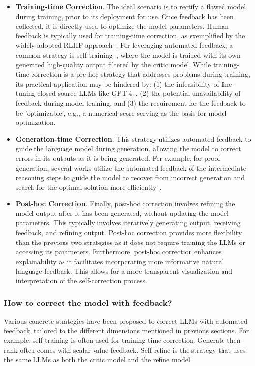 \documentclass[12pt]{extarticle}
\begin{document}
\begin{itemize}
    \item \textbf{Training-time Correction}. The ideal scenario is to rectify a flawed model during training, prior to its deployment for use. Once feedback has been collected, it is directly used to optimize the model parameters. Human feedback is typically used for training-time correction, as exemplified by the widely adopted RLHF approach~\cite{ouyang2022training}. For leveraging automated feedback, a common strategy is self-training~\cite{huang2022large}, where the model is trained with its own generated high-quality output filtered by the critic model. While training-time correction is a pre-hoc strategy that addresses problems during training, its practical application may be hindered by: (1) the infeasibility of fine-tuning closed-source LLMs like GPT-4~\cite{openai2023gpt4}, (2) the potential unavailability of feedback during model training, and (3) the requirement for the feedback to be 'optimizable', e.g., a numerical score serving as the basis for model optimization.

    \item \textbf{Generation-time Correction}. This strategy utilizes automated feedback to guide the language model during generation, allowing the model to correct errors in its outputs as it is being generated. For example, for proof generation, several works utilize the automated feedback of the intermediate reasoning steps to guide the model to recover from incorrect generation and search for the optimal solution more efficiently~\cite{yang-etal-2022-generating, lightman2023lets}.

    \item \textbf{Post-hoc Correction}. Finally, post-hoc correction involves refining the model output after it has been generated, without updating the model parameters. This typically involves iteratively generating output, receiving feedback, and refining output. Post-hoc correction provides more flexibility than the previous two strategies as it does not require training the LLMs or accessing its parameters. Furthermore, post-hoc correction enhances explainability as it facilitates incorporating more informative natural language feedback. This allows for a more transparent visualization and interpretation of the self-correction process.
\end{itemize}

\subsubsection{How to correct the model with feedback?}
Various concrete strategies have been proposed to correct LLMs with automated feedback, tailored to the different dimensions mentioned in previous sections. For example, self-training is often used for training-time correction. Generate-then-rank often comes with scalar value feedback. Self-refine is the strategy that uses the same LLMs as both the critic model and the refine model.
\end{document}
